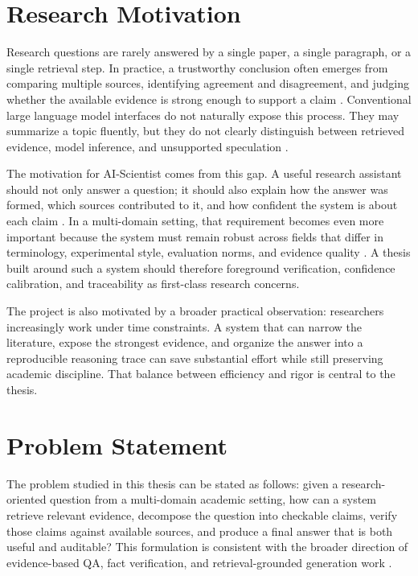 \section{Research Motivation}

Research questions are rarely answered by a single paper, a single paragraph, or a single retrieval step. In practice, a trustworthy conclusion often emerges from comparing multiple sources, identifying agreement and disagreement, and judging whether the available evidence is strong enough to support a claim \cite{thorne2018fever,wadden2020scifact}. Conventional large language model interfaces do not naturally expose this process. They may summarize a topic fluently, but they do not clearly distinguish between retrieved evidence, model inference, and unsupported speculation \cite{manakul2023selfcheckgpt,min2023factscore}.

The motivation for AI-Scientist comes from this gap. A useful research assistant should not only answer a question; it should also explain how the answer was formed, which sources contributed to it, and how confident the system is about each claim \cite{asai2024selfrag,schick2023toolformer}. In a multi-domain setting, that requirement becomes even more important because the system must remain robust across fields that differ in terminology, experimental style, evaluation norms, and evidence quality \cite{beltagy2019scibert,lee2019biobert,gu2021pubmedbert}. A thesis built around such a system should therefore foreground verification, confidence calibration, and traceability as first-class research concerns.

The project is also motivated by a broader practical observation: researchers increasingly work under time constraints. A system that can narrow the literature, expose the strongest evidence, and organize the answer into a reproducible reasoning trace can save substantial effort while still preserving academic discipline. That balance between efficiency and rigor is central to the thesis.

\section{Problem Statement}

The problem studied in this thesis can be stated as follows: given a research-oriented question from a multi-domain academic setting, how can a system retrieve relevant evidence, decompose the question into checkable claims, verify those claims against available sources, and produce a final answer that is both useful and auditable?
This formulation is consistent with the broader direction of evidence-based QA, fact verification, and retrieval-grounded generation work \cite{lewis2020rag,thorne2018fever,wadden2020scifact}.

